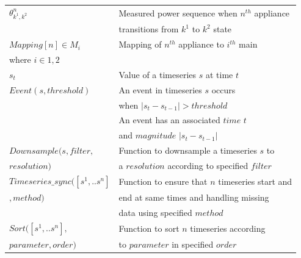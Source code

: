 \documentclass[conference]{IEEEtran}
\begin{document}
\begin{table}[ht!]
\begin{tabular}{|l|l|}
\hline
$\theta^n_{k^1,k^2}$& Measured power sequence when $n^{th}$ appliance \\[0.1cm]
& transitions from $k^1$ to $k^2$ state\\[0.1cm]
\hline
$Mapping[n] \in {M_i}$ & Mapping of $n^{th}$ appliance to $i^{th}$ main\\
where $i \in {1,2}$ & \\
\hline 
$s_t$ & Value of a timeseries $s$ at time $t$ \\
\hline
$Event(s,threshold)$ & An event in timeseries $s$ occurs \\
&when $|s_t-s_{t-1}|>threshold$\\
& An event has an associated $time$ $t$\\
& and $magnitude$ $|s_t-s_{t-1}|$\\
\hline
\hline
$Downsample(s,filter,$ & Function to downsample a timeseries $s$ to\\
$resolution)$                                        & a $resolution$ according to specified $filter$\\
\hline
$Timeseries\_sync([s^1,..s^n]$ & Function to ensure that $n$ timeseries start and\\
$,method)$                                        &end at same times and handling missing\\
                                        & data using specified $method$\\
\hline                                        
$Sort([s^1,..s^n],$ & Function to sort $n$ timeseries according\\
$parameter,order)$  &to $parameter$ in specified $order$\\

\end{tabular}
\end{table}
\end{document}

